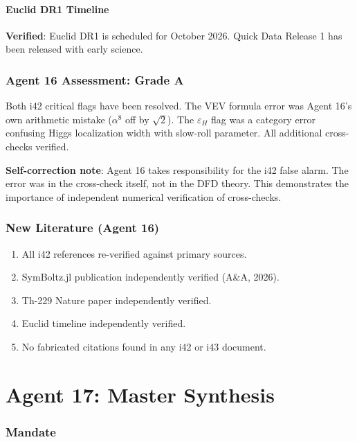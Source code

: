 \documentclass[11pt,a4paper]{article}
\begin{document}
\subsection{Euclid DR1 Timeline}

\textbf{Verified}: Euclid DR1 is scheduled for October 2026. Quick Data Release 1 has been released with early science.

\section{Agent 16 Assessment: Grade A}

Both i42 critical flags have been resolved. The VEV formula error was Agent 16's own arithmetic mistake ($\alpha^8$ off by $\sqrt{2}$). The $\varepsilon_H$ flag was a category error confusing Higgs localization width with slow-roll parameter. All additional cross-checks verified.

\textbf{Self-correction note}: Agent 16 takes responsibility for the i42 false alarm. The error was in the cross-check itself, not in the DFD theory. This demonstrates the importance of independent numerical verification of cross-checks.

\section{New Literature (Agent 16)}

\begin{enumerate}
\item All i42 references re-verified against primary sources.
\item SymBoltz.jl publication independently verified (A\&A, 2026).
\item Th-229 Nature paper independently verified.
\item Euclid timeline independently verified.
\item No fabricated citations found in any i42 or i43 document.
\end{enumerate}


\part{Agent 17: Master Synthesis}
\label{part:agent17}

\section{Mandate}
\end{document}
